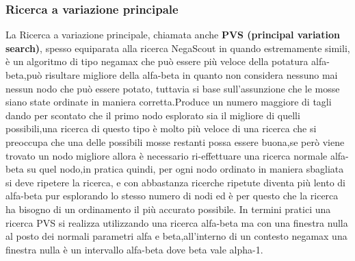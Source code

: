  


\subsubsection{Ricerca a variazione principale}
La Ricerca a variazione principale, chiamata anche \textbf{PVS (principal variation search)}, spesso equiparata alla ricerca NegaScout in quando estremamente simili, è un algoritmo di tipo negamax che può essere più veloce della potatura alfa-beta,può risultare migliore
della alfa-beta in quanto non considera nessuno mai nessun nodo che può essere potato, tuttavia si base sull'assunzione che le mosse siano state ordinate in maniera corretta.Produce un numero maggiore di tagli
dando per scontato che il primo nodo esplorato sia il migliore di quelli possibili,una ricerca di questo tipo è molto più veloce di una ricerca che si preoccupa che una delle possibili mosse restanti possa essere 
buona,se però viene trovato un nodo migliore allora è necessario ri-effettuare una ricerca normale alfa-beta su quel nodo,in pratica quindi, per ogni nodo ordinato in maniera sbagliata si deve ripetere la ricerca,
e con abbastanza ricerche ripetute diventa più lento di alfa-beta pur esplorando lo stesso numero di nodi ed è per questo che la ricerca ha bisogno di un ordinamento il più accurato possibile.
In termini pratici  una ricerca PVS si realizza utilizzando una ricerca alfa-beta ma con una finestra nulla al posto dei normali parametri alfa e beta,all'interno di un contesto negamax una finestra nulla è un 
intervallo alfa-beta dove beta vale alpha-1.



